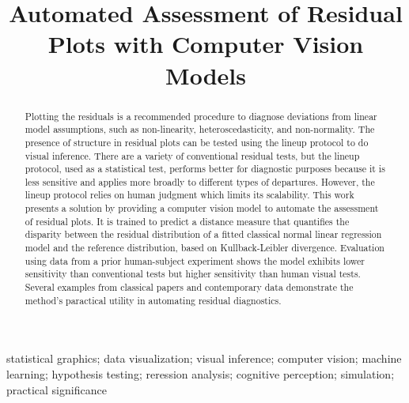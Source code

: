 \documentclass[]{interact}
\theoremstyle{plain}%
\theoremstyle{definition}
\theoremstyle{remark}
\begin{document}
\articletype{}

\title{Automated Assessment of Residual Plots with Computer Vision
Models}


\author{
}


\maketitle

\begin{abstract}
Plotting the residuals is a recommended procedure to diagnose deviations
from linear model assumptions, such as non-linearity,
heteroscedasticity, and non-normality. The presence of structure in
residual plots can be tested using the lineup protocol to do visual
inference. There are a variety of conventional residual tests, but the
lineup protocol, used as a statistical test, performs better for
diagnostic purposes because it is less sensitive and applies more
broadly to different types of departures. However, the lineup protocol
relies on human judgment which limits its scalability. This work
presents a solution by providing a computer vision model to automate the
assessment of residual plots. It is trained to predict a distance
measure that quantifies the disparity between the residual distribution
of a fitted classical normal linear regression model and the reference
distribution, based on Kullback-Leibler divergence. Evaluation using
data from a prior human-subject experiment shows the model exhibits
lower sensitivity than conventional tests but higher sensitivity than
human visual tests. Several examples from classical papers and
contemporary data demonstrate the method's paractical utility in
automating residual diagnostics.
\end{abstract}

\begin{keywords}
statistical graphics; data visualization; visual inference; computer
vision; machine learning; hypothesis testing; reression analysis;
cognitive perception; simulation; practical significance
\end{keywords}
\end{document}
